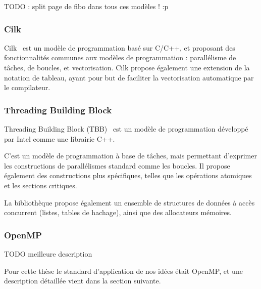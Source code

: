 TODO : split page de fibo dans tous ces modèles ! :p

\subsubsection{Cilk}

Cilk~\cite{cilk5} est un modèle de programmation basé sur C/C++, et proposant des fonctionnalités communes aux modèles de programmation : parallélisme de tâches, de boucles, et vectorisation.
Cilk propose également une extension de la notation de tableau, ayant pour but de faciliter la vectorisation automatique par le compilateur.



\subsubsection{Threading Building Block}

Threading Building Block (TBB)~\cite{Reinders2007} est un modèle de programmation développé par Intel comme une librairie C++.

C'est un modèle de programmation à base de tâches, mais permettant d'exprimer les constructions de parallélismes standard comme les boucles. Il propose également des constructions plus spécifiques, telles que les opérations atomiques et les sections critiques.

La bibliothèque propose également un ensemble de structures de données à accès concurrent (listes, tables de hachage), ainsi que des allocateurs mémoires.

\subsubsection{OpenMP}

TODO meilleure description

Pour cette thèse le standard d'application de nos idées était OpenMP, et une description détaillée vient dans la section suivante.

